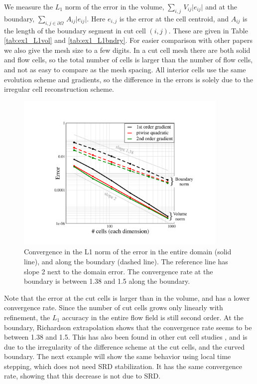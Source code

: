 We measure the $L_1$ norm of the error in the volume,   $\sum_{i,j} \,
V_{ij} \lvert e_{ij } \rvert$ and at the boundary, $ \sum_{{i,j} \in \partial \Omega} \, A_{ij} \lvert e_{ij
} \rvert$.  Here
$e_{i,j}$ is the error at the cell centroid, and $A_{ij}$ is the length of the 
boundary segment in cut cell $(i,j)$.
These are given in Table \ref{tab:ex1_L1vol} and \ref{tab:ex1_L1bndry}. 
For easier comparison with other papers we also give the mesh size 
to a few digits. In  a cut cell mesh there are both solid and
flow cells, so the total number of cells is larger than the number of
flow cells, and not as easy to compare as the mesh spacing.
All interior cells use the same evolution scheme and gradients, so
the difference in the errors is solely due to the irregular cell
reconstruction scheme.

\begin{figure}[h]
	\begin{center}
		\includegraphics[height=3.0in]{figs/gradientConv.pdf}
		\caption{\sf Convergence in the L1 norm of the error in the entire 
			domain  (solid line), and along the boundary (dashed line).
			The reference line has slope 2 next to the domain error. The convergence
			rate at the boundary is between 1.38 and 1.5
			along the boundary.
			\label{fig:ssv}}
	\end{center}
\end{figure}


Note that the error at the cut cells is larger than in the volume, and has a
lower convergence rate. Since the number of cut cells grows only
linearly with refinement, the $L_1$
accuracy in the entire flow field is still second order.  At the boundary,
Richardson extrapolation shows that the convergence rate seems to be
between 1.38 and 1.5.
This has also been found in other cut cell studies
\cite{KB:2006,nemec_tm14}, and is due to the irregularity of the
difference scheme at the cut cells, and the curved boundary. 
The next example will show the same behavior using local time stepping,
which does not need SRD stabilization. It has the same convergence rate,
showing that this decrease is
not due to SRD.

